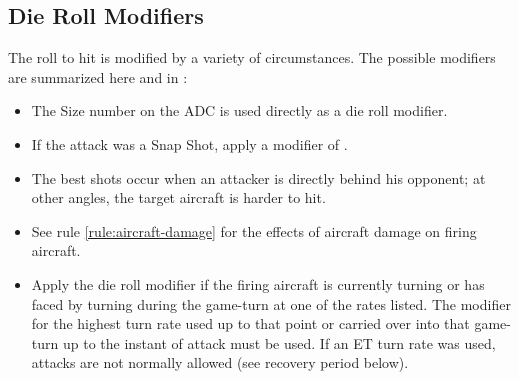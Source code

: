 
\subsection{Die Roll Modifiers}

The roll to hit is modified by a variety of circumstances. The possible modifiers are summarized here and in :


\begin{itemize}

    \item{}
        The Size number on the ADC is used directly as a die roll modifier.

    \item{}
        If the attack was a Snap Shot, apply a modifier of .

    \item{}
        The best shots occur when an attacker is directly behind his opponent; at other angles, the target aircraft is harder to hit. 


    \item{}
        See rule \ref{rule:aircraft-damage} for the effects of aircraft damage on firing aircraft.

    \item
         Apply the die roll modifier if the firing aircraft is currently turning or has faced by turning during the game-turn at one of the rates listed. The modifier for the highest turn rate used up to that point or carried over into that game-turn up to the instant of attack must be used. If an ET turn rate was used, attacks are not normally allowed (see recovery period below).


\end{itemize}
